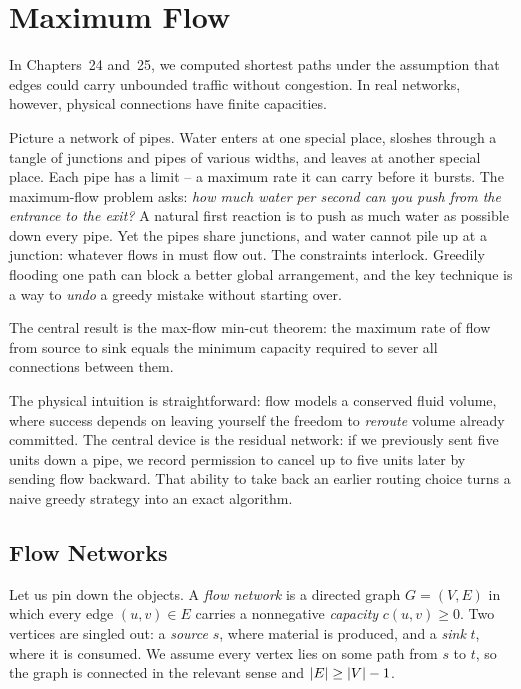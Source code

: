 \chapter{Maximum Flow}

In Chapters~24 and~25, we computed shortest paths under the assumption that edges could carry unbounded traffic without congestion. In real networks, however, physical connections have finite capacities.

Picture a network of pipes. Water enters at one special place, sloshes through
a tangle of junctions and pipes of various widths, and leaves at another
special place. Each pipe has a limit -- a maximum rate it can carry before it
bursts. The maximum-flow problem asks: \emph{how much water per second can you push from the entrance to the exit?} A natural first reaction is to push
as much water as possible down every pipe. Yet the pipes share junctions, and
water cannot pile up at a junction: whatever flows in must flow out. The constraints interlock. Greedily flooding one path
can block a better global arrangement, and the key technique is a way to
\emph{undo} a greedy mistake without starting over.

The central result is the max-flow min-cut theorem: the maximum rate of flow from source to sink equals the minimum capacity required to sever all connections between them.

\begin{intuitionbox}
The physical intuition is straightforward: flow models a conserved fluid volume,
where success depends on leaving yourself the freedom to
\emph{reroute} volume already committed. The central device is the residual
network: if we previously sent five units down a pipe, we record permission to
cancel up to five units later by sending flow backward. That ability to take
back an earlier routing choice turns a naive greedy strategy into an exact
algorithm.
\end{intuitionbox}

\section{Flow Networks}
\label{ch26:networks}

Let us pin down the objects. A \emph{flow network} is a directed graph
$G = (V, E)$ in which every edge $(u,v) \in E$ carries a nonnegative
\emph{capacity} $c(u,v) \ge 0$. Two vertices are singled out: a \emph{source}
$s$, where material is produced, and a \emph{sink} $t$, where it is consumed.
We assume every vertex lies on some path from $s$ to $t$, so the graph is
connected in the relevant sense and $\lvert E\rvert \ge \lvert V\rvert - 1$.

